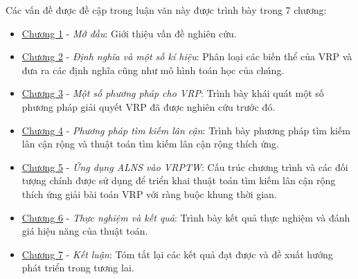 Các vấn đề được đề cập trong luận văn này được trình bày trong 7 chương: 
\begin{itemize}
  \item \hyperref[chap:introduction]{Chương 1} - \textit{Mở đầu}: Giới thiệu vấn đề nghiên cứu.
  \item \hyperref[chap:model]{Chương 2} - \textit{Định nghĩa và một số kí hiệu}: Phân loại các biến thể của VRP và đưa ra các định nghĩa cũng như mô hình toán học của chúng.
  \item \hyperref[chap:solution]{Chương 3} - \textit{Một số phương pháp cho VRP}: Trình bày khái quát một số  phương pháp giải quyết VRP đã được nghiên cứu trước đó.
  \item \hyperref[chap:search]{Chương 4} - \textit{Phương pháp tìm kiếm lân cận}: Trình bày phương pháp tìm kiếm lân cận rộng và thuật toán tìm kiếm lân cận rộng thích ứng.
  \item \hyperref[chap:application]{Chương 5} - \textit{Ứng dụng ALNS vào VRPTW}: Cấu trúc chương trình và các đối tượng chính được sử dụng để triển khai thuật toán tìm kiếm lân cận rộng thích ứng giải bài toán VRP với ràng buộc khung thời gian.
  \item \hyperref[chap:experiment]{Chương 6} - \textit{Thực nghiệm và kết quả}: Trình bày kết quả thực nghiệm và đánh giá hiệu năng của thuật toán.
  \item \hyperref[chap:conclusion]{Chương 7} - \textit{Kết luận}: Tóm tắt lại các kết quả đạt được và đề xuất hướng phát triển trong tương lai.
\end{itemize}
